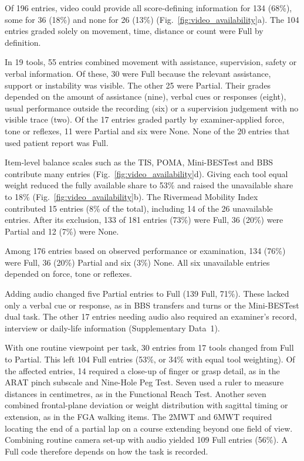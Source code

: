 \documentclass[11pt]{article}
\begin{document}


Of 196 entries, video could provide all score-defining information for 134 (68\%), some for 36 (18\%) and none for 26 (13\%) (Fig.~\ref{fig:video_availability}a). The 104 entries graded solely on movement, time, distance or count were Full by definition.

In 19 tools, 55 entries combined movement with assistance, supervision, safety or verbal information. Of these, 30 were Full because the relevant assistance, support or instability was visible. The other 25 were Partial. Their grades depended on the amount of assistance (nine), verbal cues or responses (eight), usual performance outside the recording (six) or a supervision judgement with no visible trace (two). Of the 17 entries graded partly by examiner-applied force, tone or reflexes, 11 were Partial and six were None. None of the 20 entries that used patient report was Full.

Item-level balance scales such as the TIS, POMA, Mini-BESTest and BBS contribute many entries (Fig.~\ref{fig:video_availability}d). Giving each tool equal weight reduced the fully available share to 53\% and raised the unavailable share to 18\% (Fig.~\ref{fig:video_availability}b). The Rivermead Mobility Index contributed 15 entries (8\% of the total), including 14 of the 26 unavailable entries. After its exclusion, 133 of 181 entries (73\%) were Full, 36 (20\%) were Partial and 12 (7\%) were None.

Among 176 entries based on observed performance or examination, 134 (76\%) were Full, 36 (20\%) Partial and six (3\%) None. All six unavailable entries depended on force, tone or reflexes.

Adding audio changed five Partial entries to Full (139 Full, 71\%). These lacked only a verbal cue or response, as in BBS transfers and turns or the Mini-BESTest dual task. The other 17 entries needing audio also required an examiner's record, interview or daily-life information (Supplementary Data~1).

With one routine viewpoint per task, 30 entries from 17 tools changed from Full to Partial. This left 104 Full entries (53\%, or 34\% with equal tool weighting). Of the affected entries, 14 required a close-up of finger or grasp detail, as in the ARAT pinch subscale and Nine-Hole Peg Test. Seven used a ruler to measure distances in centimetres, as in the Functional Reach Test. Another seven combined frontal-plane deviation or weight distribution with sagittal timing or extension, as in the FGA walking items. The 2MWT and 6MWT required locating the end of a partial lap on a course extending beyond one field of view. Combining routine camera set-up with audio yielded 109 Full entries (56\%). A Full code therefore depends on how the task is recorded.
\end{document}
